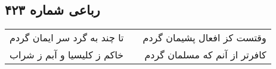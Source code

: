 \begin{center}
\section*{رباعی شماره ۴۲۳}
\label{sec:sh423}
\begin{longtable}{l p{0.5cm} r}
تا چند به گرد سر ایمان گردم
&&
وقتست کز افعال پشیمان گردم
\\
خاکم ز کلیسیا و آبم ز شراب
&&
کافرتر از آنم که مسلمان گردم
\\
\end{longtable}
\end{center}
